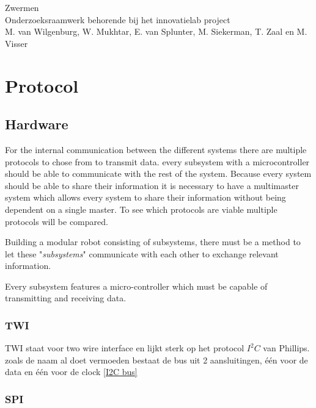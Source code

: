 \documentclass[10pt,a4paper]{article}
\begin{document}
\begin{titlepage}
    \centering
    \vfill
    {\Large
    Zwermen\\
   
    {\small Onderzoeksraamwerk behorende bij het innovatielab project}\\
        
        \vskip2cm
        {\small M. van Wilgenburg, W. Mukhtar, E. van Splunter, M. Siekerman, T. Zaal en M. Visser}\\
    }    
    \vfill
    
    \vfill
    \vfill
\end{titlepage}

\newpage

\tableofcontents
\newpage


\section{Protocol}
\subsection{Hardware}

For the internal communication between the different systems there are multiple protocols to chose from to transmit data. every subsystem with a microcontroller should be able to communicate with the rest of the system. Because every system should be able to share their information it is necessary to have a multimaster system which allows every system to share their information without being dependent on a single master. To see which protocols are viable multiple protocols will be compared.

Building a modular robot consisting of subsystems, there must be a method to let these "\textit{subsystems}" communicate with each other to exchange relevant information. 

Every subsystem features a micro-controller which must be capable of transmitting and receiving data.  

\subsubsection{TWI}
TWI staat voor two wire interface en lijkt sterk op het protocol $I^{2}C$ van Phillips. zoals de naam al doet vermoeden bestaat de bus uit 2 aansluitingen, één voor de data en één voor de clock \ref{I2C bus}
\subsubsection{SPI}
\end{document}

